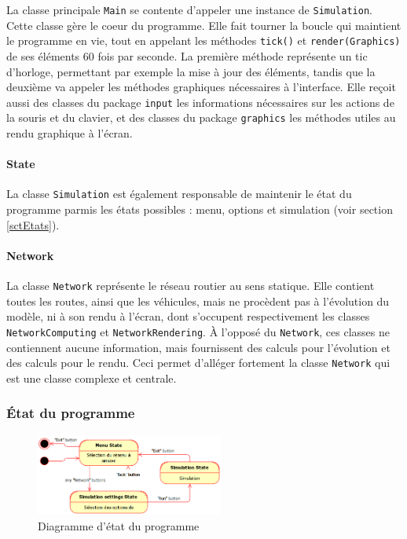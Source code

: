 \documentclass[a4paper,11pt, titlepage]{extarticle}
\begin{document}
La classe principale \texttt{Main} se contente d'appeler une instance de \texttt{Simulation}. Cette classe gère le coeur du programme. Elle fait tourner la boucle qui maintient le programme en vie, tout en appelant les méthodes \texttt{tick()} et \texttt{render(Graphics)} de ses éléments 60 fois par seconde. La première méthode représente un tic d'horloge, permettant par exemple la mise à jour des éléments, tandis que la deuxième va appeler les méthodes graphiques nécessaires à l'interface. Elle reçoit aussi des classes du package \texttt{input} les informations nécessaires sur les actions de la souris et du clavier, et des classes du package \texttt{graphics} les méthodes utiles au rendu graphique à l'écran.

\paragraph{State}

La classe \texttt{Simulation} est également responsable de maintenir le état du programme parmis les états possibles : menu, options et simulation (voir section \ref{sctEtats}).

\paragraph{Network}

La classe \texttt{Network} représente le réseau routier au sens statique. Elle contient toutes les routes, ainsi que les véhicules, mais ne procèdent pas à l'évolution du modèle, ni à son rendu à l'écran, dont s'occupent respectivement les classes \texttt{NetworkComputing} et \texttt{NetworkRendering}. À l'opposé du \texttt{Network}, ces classes ne contiennent aucune information, mais fournissent des calculs pour l'évolution et des calculs pour le rendu. Ceci permet d'alléger fortement la classe \texttt{Network} qui est une classe complexe et centrale.

\subsubsection{\label{sctEtats}État du programme}

\begin{figure}
  \vspace{-1cm}

  \begin{center}
    \includegraphics[width=0.55\textwidth]{states_diagram.png}
  \end{center}
  \caption{Diagramme d'état du programme}
  \label{imgStates}
\end{figure}
\end{document}
